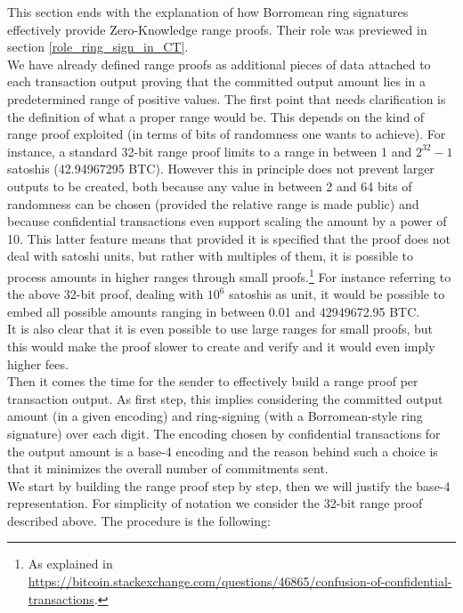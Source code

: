 This section ends with the explanation of how Borromean ring signatures effectively provide Zero-Knowledge range proofs. Their role was previewed in section \ref{role_ring_sign_in_CT}.\\
We have already defined range proofs as additional pieces of data attached to each transaction output proving that the committed output amount lies in a predetermined range of positive values. The first point that needs clarification is the definition of what a proper range would be. This depends on the kind of range proof exploited (in terms of bits of randomness one wants to achieve). For instance, a standard 32-bit range proof limits to a range in between 1 and $2^{32}-1$ satoshis (42.94967295 BTC). However this in principle does not prevent larger outputs to be created, both because any value in between 2 and 64 bits of randomness can be chosen (provided the relative range is made public) and because confidential transactions even support scaling the amount by a power of 10. This latter feature means that provided it is specified that the proof does not deal with satoshi units, but rather with multiples of them, it is possible to process amounts in higher ranges through small proofs.\footnote{As explained in \url{https://bitcoin.stackexchange.com/questions/46865/confusion-of-confidential-transactions}.} For instance referring to the above 32-bit proof, dealing with $10^6$ satoshis as unit, it would be possible to embed all possible amounts ranging in between 0.01 and 42949672.95 BTC. \\
It is also clear that it is even possible to use large ranges for small proofs, but this would make the proof slower to create and verify and it would even imply higher fees.\\
Then it comes the time for the sender to effectively build a range proof per transaction output. As first step, this implies considering the committed output amount (in a given encoding) and ring-signing (with a Borromean-style ring signature) over each digit. The encoding chosen by confidential transactions for the output amount is a base-4 encoding and the reason behind such a choice is that it minimizes the overall number of commitments sent.\\
We start by building the range proof step by step, then we will justify the base-4 representation. For simplicity of notation we consider the 32-bit range proof described above. The procedure is the following:

